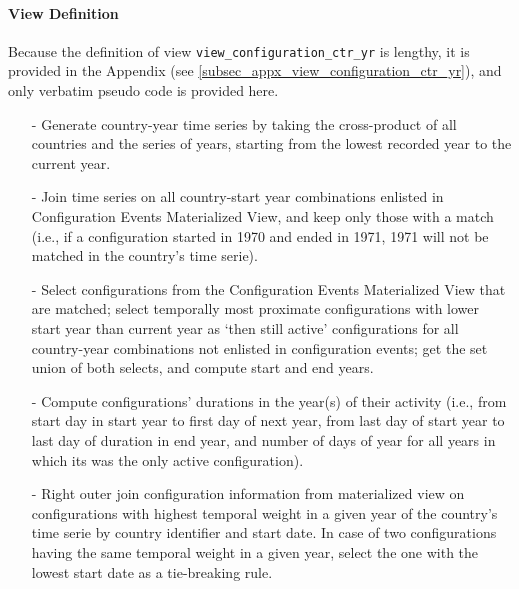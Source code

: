 \paragraph{View Definition}
Because the definition of view \texttt{view\_configuration\_ctr\_yr} is lengthy, it is provided in the Appendix (see \ref{subsec_appx_view_configuration_ctr_yr}), and only verbatim pseudo code is provided here.
\begin{itemize}
\item[-]{Generate country-year time series by taking the cross-product of all countries and the series of years, starting from the lowest recorded year to the current year.}
\item[-]{Join time series on all country-start year combinations enlisted in Configuration Events Materialized View, and keep only those with a match (i.e., if a configuration started in 1970 and ended in 1971, 1971 will not be matched in the country's time serie).}
\item[-]{Select configurations from the Configuration Events Materialized View that are matched; select temporally most proximate configurations with lower start year than current year as `then still active' configurations for all country-year combinations not enlisted in configuration events; get the set union of both selects, and compute start and end years.}
\item[-]{Compute configurations' durations in the year(s) of their activity (i.e., from start day in start year to first day of next year, from last day of start year to last day of duration in end year, and number of days of year for all years in which its was the only active configuration).}
\item[-]{Right outer join configuration information from materialized view on configurations with highest temporal weight in a given year of the country's time serie by country identifier and start date. 
In case of two configurations having the same temporal weight in a given year, select the one with the lowest start date as a tie-breaking rule.}
\end{itemize}



